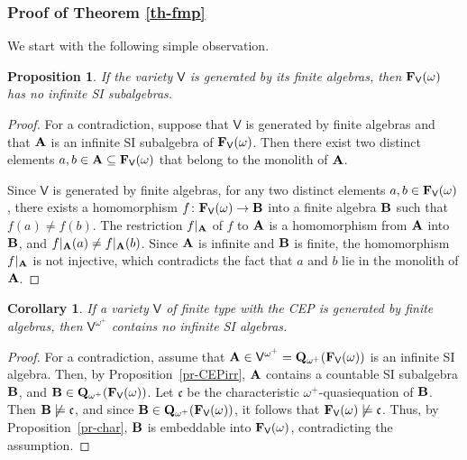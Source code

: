 \documentclass[submission,copyright,creativecommons]{eptcs}
\newtheorem{cor}[theorem]{Corollary}
\newtheorem{prop}[theorem]{Proposition}
\theoremstyle{definition}
\newcommand{\alg}[1]{{{\textbf{\upshape #1}}}}
\newcommand{\QQ}{\mathbf{Q}}
\newcommand{\SU}{\pmb{S}}
\newcommand{\II}{\pmb{I}}
\newcommand{\PP}{\pmb{P}}
\newcommand{\vv}[1]{\mathsf {#1}}
\newcommand{\vV}{\vv V}
\newcommand{\FrV}{\alg F_\vv V(\omega)}
\newcommand{\csq}{\mathfrak{c}}
\newcommand{\VP}{\vv V^p}
\begin{document}
\subsubsection*{Proof of Theorem \ref{th-fmp}}

We start with the following simple observation.

\begin{prop}\label{pr-fainfsi}
	If the variety $\vv V$ is generated by its finite algebras, then $\alg F_\vv V(\omega)$ has no infinite SI subalgebras.
\end{prop}

\begin{proof}
	For a contradiction, suppose that $\vv V$ is generated by finite algebras and that $\alg A$ is an infinite SI subalgebra of $\alg F_\vv V(\omega)$. Then there exist two distinct elements $a,b \in \alg A \subseteq \alg F_\vv V(\omega)$ that belong to the monolith of $\alg A$.
	
	Since $\vv V$ is generated by finite algebras, for any two distinct elements $a,b \in \alg F_\vv V(\omega)$, there exists a homomorphism $f \colon \alg F_\vv V(\omega) \to \alg B$ into a finite algebra $\alg B$ such that $f(a) \neq f(b)$. The restriction $f|_{\alg A}$ of $f$ to $\alg A$ is a homomorphism from $\alg A$ into $\alg B$, and $f|_{\alg A}(a) \neq f|_{\alg A}(b)$. Since $\alg A$ is infinite and $\alg B$ is finite, the homomorphism $f|_{\alg A}$ is not injective, which contradicts the fact that $a$ and $b$ lie in the monolith of $\alg A$.
\end{proof}


\begin{cor}\label{cor-FASScore}
	If a variety $\vv V$ of finite type with the CEP is generated by finite algebras, then $\vV^{\omega^+}$ contains no infinite SI algebras. 
\end{cor}

\begin{proof}
	For a contradiction, assume that $\alg{A} \in \vV^{\omega^+} = \QQ_{\omega^+}(\FrV)$ is an infinite SI algebra. Then, by Proposition~\ref{pr-CEPirr}, $\alg A$ contains a countable SI subalgebra $\alg{B}$, and $\alg B \in \QQ_{\omega^+}(\FrV)$. Let $\csq$ be the characteristic $\omega^+$-quasiequation of $\alg{B}$. Then $\alg{B} \not\models \csq$, and since $\alg B \in \QQ_{\omega^+}(\FrV)$, it follows that $\FrV \not\models \csq$. Thus, by Proposition~\ref{pr-char}, $\alg B$ is embeddable into $\FrV$, contradicting the assumption.
\end{proof}
\end{document}
